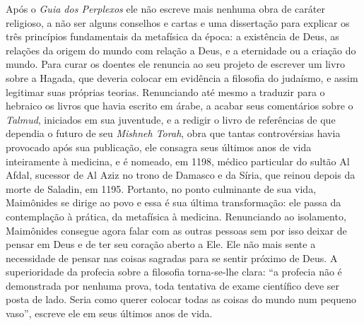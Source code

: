 Após o \emph{Guia dos Perplexos} ele não escreve mais nenhuma obra de
caráter religioso, a não ser alguns conselhos e cartas e uma dissertação
para explicar os três princípios fundamentais da metafísica da época: a
existência de Deus, as relações da origem do mundo com relação a Deus, e
a eternidade ou a criação do mundo. Para curar os doentes ele renuncia
ao seu projeto de escrever um livro sobre a Hagada, que deveria colocar
em evidência a filosofia do judaísmo, e assim legitimar suas próprias
teorias. Renunciando até mesmo a traduzir para o hebraico os livros que
havia escrito em árabe, a acabar seus comentários sobre o \emph{Talmud},
iniciados em sua juventude, e a redigir o livro de referências de que
dependia o futuro de seu \emph{Mishneh Torah}, obra que tantas
controvérsias havia provocado após sua publicação, ele consagra seus
últimos anos de vida inteiramente à medicina, e é nomeado, em 1198,
médico particular do sultão Al Afdal, sucessor de Al Aziz no trono de
Damasco e da Síria, que reinou depois da morte de Saladin, em 1195.
Portanto, no ponto culminante de sua vida, Maimônides se dirige ao povo
e essa é sua última transformação: ele passa da contemplação à prática,
da metafísica à medicina. Renunciando ao isolamento, Maimônides
consegue agora falar com as outras pessoas sem por isso deixar de pensar
em Deus e de ter seu coração aberto a Ele. Ele não mais sente a
necessidade de pensar nas coisas sagradas para se sentir próximo de
Deus. A superioridade da profecia sobre a filosofia torna-se-lhe clara:
``a profecia não é demonstrada por nenhuma prova, toda tentativa de
exame científico deve ser posta de lado. Seria como querer colocar
todas as coisas do mundo num pequeno vaso'', escreve ele em seus últimos
anos de vida.

